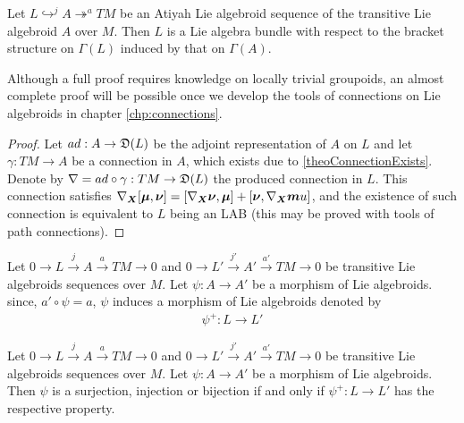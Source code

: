 \begin{theorem}\label{theoAdjointLAB} %
Let $L \hookrightarrow^j A \twoheadrightarrow^a TM$ be an Atiyah Lie algebroid sequence of the transitive Lie algebroid $A$ over $M$. Then $L$ is a Lie algebra bundle with respect to the bracket structure on $\Gamma(L)$ induced by that on $\Gamma(A)$.
\end{theorem}
Although a full proof requires knowledge on locally trivial groupoids, an almost complete proof will be possible once we develop the tools of connections on Lie algebroids in chapter \ref{chp:connections}. 
\begin{proof}
Let $ad: A \to \mathfrak{D}(L)$ be the adjoint representation of $A$ on $L$ and let $\gamma: TM \to A$ be a connection in $A$, which exists due to \ref{theoConnectionExists}. Denote by $\nabla = ad \circ \gamma : TM \to \mathfrak{D}(L)$ the produced connection in $L$. This connection satisfies $\nabla_{\bm{X}}[\bm{\mu}, \bm{\nu}] = [\nabla_{\bm{X}} \bm{\nu}, \bm{\mu}] + [\bm{\nu}, \nabla_{\bm{X}} \bm{m}u]$, and the existence of such connection is equivalent to $L$ being an LAB (this may be proved with tools of path connections).
\end{proof}

\begin{definition}\label{defnPhi+}
Let $0 \to L \xrightarrow{j} A \xrightarrow{a} TM \to 0$ and $0 \to L' \xrightarrow{j'} A' \xrightarrow{a'} TM \to 0$ be transitive Lie algebroids sequences over $M$. Let $\psi: A \to A'$ be a morphism of Lie algebroids. since, $a' \circ \psi = a$, $\psi$ induces a morphism of Lie algebroids denoted by
\begin{align*}
    \psi^+: L \to L'
\end{align*}
\end{definition}

\begin{proposition}
Let $0 \to L \xrightarrow{j} A \xrightarrow{a} TM \to 0$ and $0 \to L' \xrightarrow{j'} A' \xrightarrow{a'} TM \to 0$ be transitive Lie algebroids sequences over $M$. Let $\psi: A \to A'$ be a morphism of Lie algebroids. Then $\psi$ is a surjection, injection or bijection if and only if $\psi^+: L \to L'$ has the respective property.
\end{proposition}

